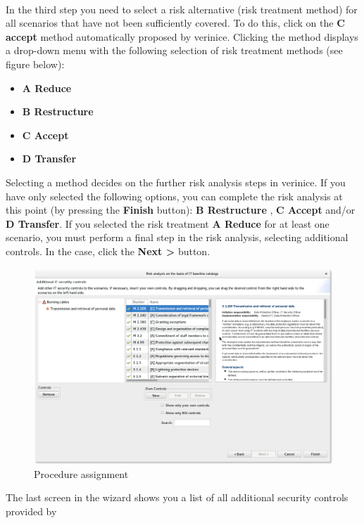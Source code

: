 \documentclass[a4paper,10pt]{book}
\begin{document}
\newline\\
In the third step you need to select a risk alternative (risk treatment method) for all scenarios
that have not been sufficiently covered. To do this, click on the \textbf{C accept}
method automatically proposed by verinice. Clicking the method displays a drop-down menu with
the following selection of risk treatment methods (see figure below):
\begin{itemize}
 \item{\textbf{A Reduce}}
 \item{\textbf{B Restructure}}
 \item{\textbf{C Accept}}
 \item{\textbf{D Transfer}}
\end{itemize}
Selecting a method decides on the further risk analysis steps in verinice. If you have only
selected the following options, you can complete the risk analysis at this point (by pressing the
\textbf{Finish} button): \textbf{B Restructure} , \textbf{C Accept} and/or \textbf{D Transfer}.
If you selected the risk treatment \textbf{A Reduce} for at least one scenario, you must perform a
final step in the risk analysis, selecting additional controls. In the case, click the \textbf{Next \textgreater}
button.
\newline
\begin{figure}[htb!]
  \centering
  \includegraphics[width=\textwidth]{Screenshot/Massnahmenzuordnung-en.png}
  \caption{\label{Procedure assignment} Procedure assignment}
\end{figure}
\newline
The last screen in the wizard shows you a list of all additional security controls provided by
\end{document}
